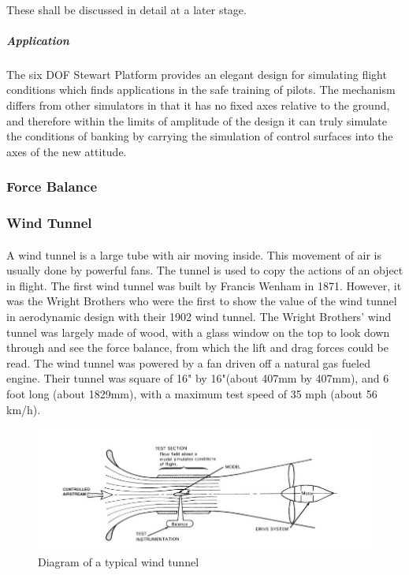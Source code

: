 \paragraph{}These shall be discussed in detail at a later stage.

\subparagraph{Application}
\paragraph{}The six DOF Stewart Platform provides an elegant design for simulating flight conditions which finds applications in the safe training of pilots. The mechanism differs from other simulators in that it has no fixed axes relative to the ground, and therefore within the limits of amplitude of the design it can truly simulate the conditions of banking by carrying the simulation of control surfaces into the axes of the new attitude.

\subsubsection{Force Balance}
\subsubsection{Wind Tunnel}
\paragraph{}
A wind tunnel is a large tube with air moving inside. This movement of air is usually done by powerful fans. The tunnel is used to copy the actions of an object in flight. The first wind tunnel was built by
Francis Wenham in 1871. However, it was the Wright Brothers who were the first to show the value of the wind tunnel in aerodynamic design with their 1902 wind tunnel.  The Wright Brothers’ wind tunnel was largely made of wood, with a glass window on the top to look down through and see the force balance, from which the
lift and drag forces could be read. The wind tunnel was powered by a fan driven off a natural gas fueled engine. Their tunnel was square of 16" by 16"(about 407mm by 407mm), and 6 foot long (about 1829mm), with a maximum test speed of 35 mph (about 56 km/h).
\begin{figure}[!h]
\includegraphics{Figures/Fig2}
\caption{Diagram of a typical wind tunnel}
\end{figure}
